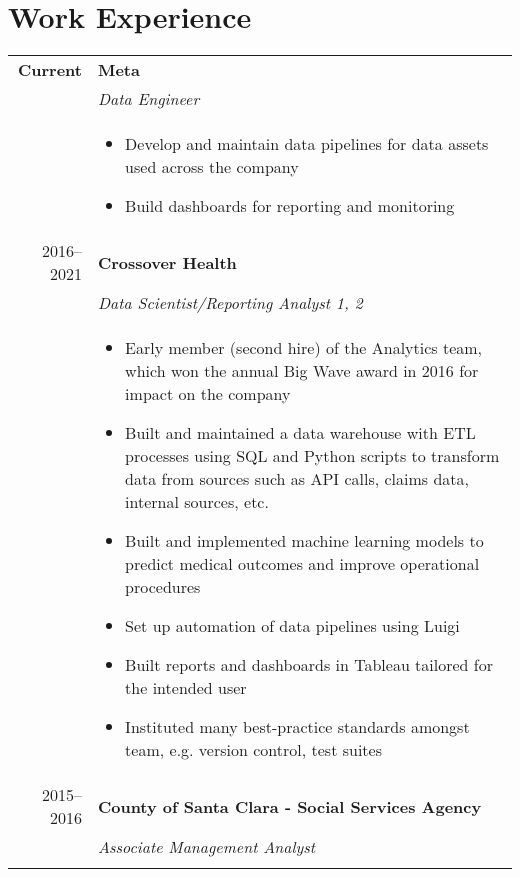 \documentclass[letterpaper,10pt]{article}
\begin{document}
\nopagebreak
\section{Work Experience}
\begin{tabular}{rp{13cm}}
  \textbf{Current} & \textbf{Meta} \\
  		& \emph{Data Engineer} \\
		& 
			\begin{itemize}
            	\item Develop and maintain data pipelines for data assets used across the company
			\item Build dashboards for reporting and monitoring
			\end{itemize}\\
  2016--2021 & \textbf{Crossover Health} \\
		& \emph{Data Scientist/Reporting Analyst 1, 2} \\
		& 
			\begin{itemize}
            	\item Early member (second hire) of the Analytics team, which won the annual Big Wave award in 2016 for impact on the company
			\item Built and maintained a data warehouse with ETL processes using SQL and Python scripts to transform data from sources such as API calls, claims data, internal sources, etc.  
			\item Built and implemented machine learning models to predict medical outcomes and improve operational procedures
			\item Set up automation of data pipelines using Luigi
			\item Built reports and dashboards in Tableau tailored for the intended user
			\item Instituted many best-practice standards amongst team, e.g. version control, test suites
			\end{itemize}\\
	2015--2016 & \textbf{County of Santa Clara - Social Services Agency} \\
 		& \emph{Associate Management Analyst}\\
		& 
			\begin{itemize}

\end{itemize}
\end{tabular}
\end{document}

